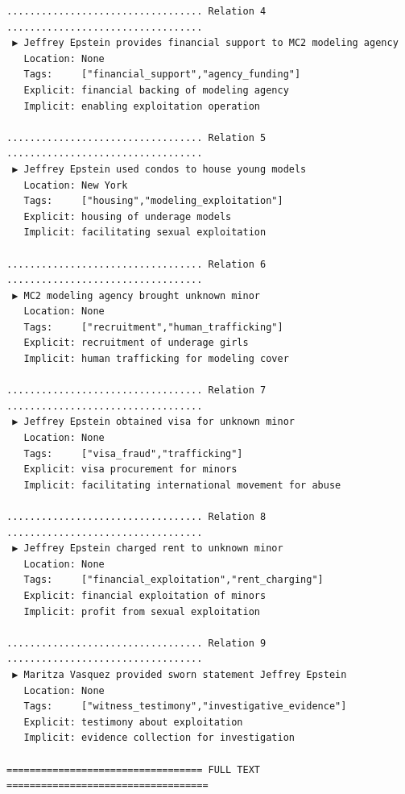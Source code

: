 \documentclass[
  italian,
  a4paper,
]{article}
\def\listingname{Codice}%
\providecommand{\thecodelisting}{\arabic{codelisting}}%
\renewenvironment{codelisting}{%
      \par\medskip\noindent%
      \refstepcounter{codelisting}%
      \def\caption##1{##1\par\noindent\small\listingname~\thecodelisting\par}%
    }{\par\medskip}%
\begin{document}
\begin{codelisting}
{\begin{verbatim}
.................................. Relation 4 ..................................
 ▶ Jeffrey Epstein provides financial support to MC2 modeling agency
   Location: None
   Tags:     ["financial_support","agency_funding"]
   Explicit: financial backing of modeling agency
   Implicit: enabling exploitation operation

.................................. Relation 5 ..................................
 ▶ Jeffrey Epstein used condos to house young models
   Location: New York
   Tags:     ["housing","modeling_exploitation"]
   Explicit: housing of underage models
   Implicit: facilitating sexual exploitation

.................................. Relation 6 ..................................
 ▶ MC2 modeling agency brought unknown minor
   Location: None
   Tags:     ["recruitment","human_trafficking"]
   Explicit: recruitment of underage girls
   Implicit: human trafficking for modeling cover

.................................. Relation 7 ..................................
 ▶ Jeffrey Epstein obtained visa for unknown minor
   Location: None
   Tags:     ["visa_fraud","trafficking"]
   Explicit: visa procurement for minors
   Implicit: facilitating international movement for abuse

.................................. Relation 8 ..................................
 ▶ Jeffrey Epstein charged rent to unknown minor
   Location: None
   Tags:     ["financial_exploitation","rent_charging"]
   Explicit: financial exploitation of minors
   Implicit: profit from sexual exploitation

.................................. Relation 9 ..................................
 ▶ Maritza Vasquez provided sworn statement Jeffrey Epstein
   Location: None
   Tags:     ["witness_testimony","investigative_evidence"]
   Explicit: testimony about exploitation
   Implicit: evidence collection for investigation

================================== FULL TEXT ===================================


\end{verbatim}}
\end{codelisting}
\end{document}
